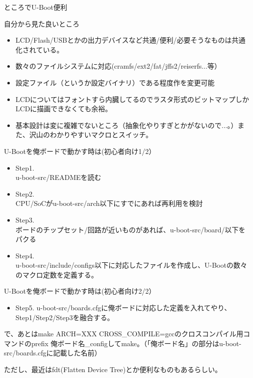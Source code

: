 \begin{frame}{ところでU-Boot便利}

自分から見た良いところ

\begin{itemize}
\item LCD/Flash/USBとかの出力デバイスなど共通/便利/必要そうなものは共通化されている。
\item 数々のファイルシステムに対応(cramfs/ext2/fat/jffs2/reiserfs...等）
\item 設定ファイル（というか設定バイナリ）である程度作を変更可能
\item LCDについてはフォントすら内臓してるのでラスタ形式のビットマップしかLCDに描画できなくても余裕。
\item 基本設計は変に複雑でないところ（抽象化やりすぎとかがないので...。）また、沢山のわかりやすいマクロとスイッチ。
\end{itemize}

\end{frame}

\begin{frame}{U-Bootを俺ボードで動かす時は(初心者向け1/2）}

\begin{itemize}
\item Step1. \\
u-boot-src/READMEを読む
\item Step2.\\
CPU/SoCがu-boot-src/arch以下にすでにあれば再利用を検討
\item Step3. \\
ボードのチップセット/回路が近いものがあれば、u-boot-src/board/以下をパクる
\item Step4. \\
u-boot-src/include/configs以下に対応したファイルを作成し、U-Bootの数々のマクロ定数を定義する。
\end{itemize}

\end{frame}

\begin{frame}{U-Bootを俺ボードで動かす時は(初心者向け2/2）}

\begin{itemize}
\item Step5. u-boot-src/boards.cfgに俺ボードに対応した定義を入れてやり、Step1/Step2/Step3を融合する。
\end{itemize}

で、あとはmake ARCH=XXX CROSS\_COMPILE=gccのクロスコンパイル用コマンドのprefix 俺ボード名\_configしてmake。（「俺ボード名」の部分はu-boot-src/boards.cfgに記載した名前）

ただし、最近はfdt(Flatten Device Tree)とか便利なものもあるらしい。

\end{frame}


